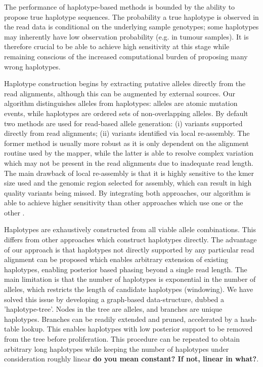\documentclass[notitlepage, twocolumn]{article}
\begin{document}
The performance of haplotype-based methods is bounded by the ability to propose true haplotype sequences. The probability a true haplotype is observed in the read data is conditional on the underlying sample genotypes; some haplotypes may inherently have low observation probability (e.g. in tumour samples). It is therefore crucial to be able to achieve high sensitivity at this stage while remaining conscious of the increased computational burden of proposing many wrong haplotypes.

Haplotype construction begins by extracting putative alleles directly from the read alignments, although this can be augmented by external sources. Our algorithm distinguishes alleles from haplotypes: alleles are atomic mutation events, while haplotypes are ordered sets of non-overlapping alleles. By default two methods are used for read-based allele generation: (i) variants supported directly from read alignments; (ii) variants identified via local re-assembly. The former method is usually more robust as it is only dependent on the alignment routine used by the mapper, while  the latter is able to resolve complex variation which may not be present in the read alignments due to inadequate read length. The main drawback of local re-assembly is that it is highly sensitive to the kmer size used and the genomic region selected for assembly, which can result in high quality variants being missed. By integrating both approaches, our algorithm is able to achieve higher sensitivity than other approaches which use one or the other \cite{gatk, freebayes}.

Haplotypes are exhaustively constructed from all viable allele combinations. This differs from other approaches which construct haplotypes directly. The advantage of our approach is that haplotypes not directly supported by any particular read alignment can be proposed which enables arbitrary extension of existing haplotypes, enabling posterior based phasing beyond a single read length. The main limitation is that the number of haplotypes is exponential in the number of alleles, which restricts the length of candidate haplotypes (windowing). We have solved this issue by developing a graph-based data-structure, dubbed a 'haplotype-tree'. Nodes in the tree are alleles, and branches are unique haplotypes. Branches can be readily extended and pruned, accelerated by a hash-table lookup. This enables haplotypes with low posterior support to be removed from the tree before proliferation. This procedure can be repeated to obtain arbitrary long haplotypes while keeping the number of haplotypes under consideration roughly linear {\bf do you mean constant? If not, linear in what?}.
\end{document}
